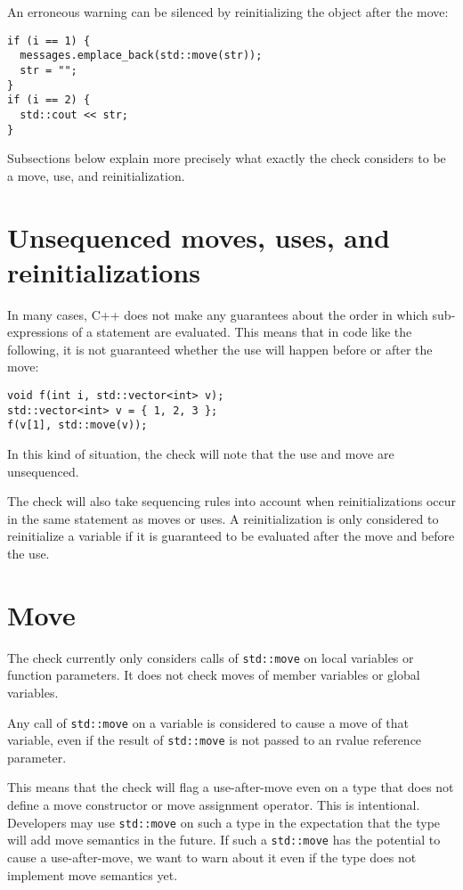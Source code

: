 An erroneous warning can be silenced by reinitializing the object after the move:
\begin{verbatim}
if (i == 1) {
  messages.emplace_back(std::move(str));
  str = "";
}
if (i == 2) {
  std::cout << str;
}
\end{verbatim}

Subsections below explain more precisely what exactly the check considers to be a move, use, and reinitialization.

\section{Unsequenced moves, uses, and reinitializations}\label{sec:unsequenced-moves-uses-and-reinitializations}
In many cases, C++ does not make any guarantees about the order in which sub-expressions of a statement are evaluated. This means that in code like the following, it is not guaranteed whether the use will happen before or after the move:
\begin{verbatim}
void f(int i, std::vector<int> v);
std::vector<int> v = { 1, 2, 3 };
f(v[1], std::move(v));
\end{verbatim}
In this kind of situation, the check will note that the use and move are unsequenced.

The check will also take sequencing rules into account when reinitializations occur in the same statement as moves or uses. A reinitialization is only considered to reinitialize a variable if it is guaranteed to be evaluated after the move and before the use.

\section{Move}
The check currently only considers calls of \texttt{std::move} on local variables or function parameters. It does not check moves of member variables or global variables.

Any call of \texttt{std::move} on a variable is considered to cause a move of that variable, even if the result of \texttt{std::move} is not passed to an rvalue reference parameter.

This means that the check will flag a use-after-move even on a type that does not define a move constructor or move assignment operator. This is intentional. Developers may use \texttt{std::move} on such a type in the expectation that the type will add move semantics in the future. If such a \texttt{std::move} has the potential to cause a use-after-move, we want to warn about it even if the type does not implement move semantics yet.

